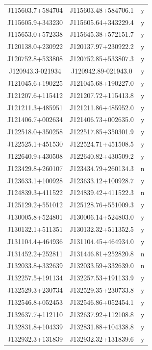 \begin{table}
\begin{tabular}{ccc}
        J115603.7+584704 & J115603.48+584706.1 & y\\
        J115605.9+343230 & J115605.64+343229.4 & y\\
        J115653.0+572338 & J115645.38+572151.7 & y\\
        J120138.0+230922 & J120137.97+230922.2 & y\\
        J120752.8+533808 & J120752.85+533807.3 & y\\
        J120943.3-021934 & J120942.89-021943.0 & y\\
        J121045.6+190225 & J121045.68+190227.0 & y\\
        J121207.6+115412 & J121207.72+115413.8 & y\\
        J121211.3+485951 & J121211.86+485952.0 & y\\
        J121406.7+002634 & J121406.73+002635.0 & y\\
        J122518.0+350258 & J122517.85+350301.9 & y\\
        J122525.1+451530 & J122524.71+451508.5 & y\\
        J122640.9+430508 & J122640.82+430509.2 & y\\
        J123429.8+260107 & J123434.79+260134.3 & n\\
        J123633.1+100928 & J123633.12+100928.7 & y\\
        J124839.3+411522 & J124839.42+411522.3 & n\\
        J125129.2+551012 & J125128.76+551009.3 & y\\
        J130005.8+524801 & J130006.14+524803.0 & y\\
        J130132.1+511351 & J130132.32+511352.5 & y\\
        J131104.4+464936 & J131104.45+464934.0 & y\\
        J131452.2+252811 & J131446.81+252820.8 & n\\
        J132033.8+332639 & J132033.59+332639.0 & n\\
        J132257.5+191134 & J132257.53+191133.9 & y\\
        J132529.3+230734 & J132529.35+230733.8 & y\\
        J132546.8+052453 & J132546.86+052454.1 & y\\
        J132637.7+112110 & J132637.92+112108.8 & y\\
        J132831.8+104339 & J132831.88+104338.8 & y\\
        J132932.3+131839 & J132932.32+131839.6 & y\\

\end{tabular}
\end{table}
